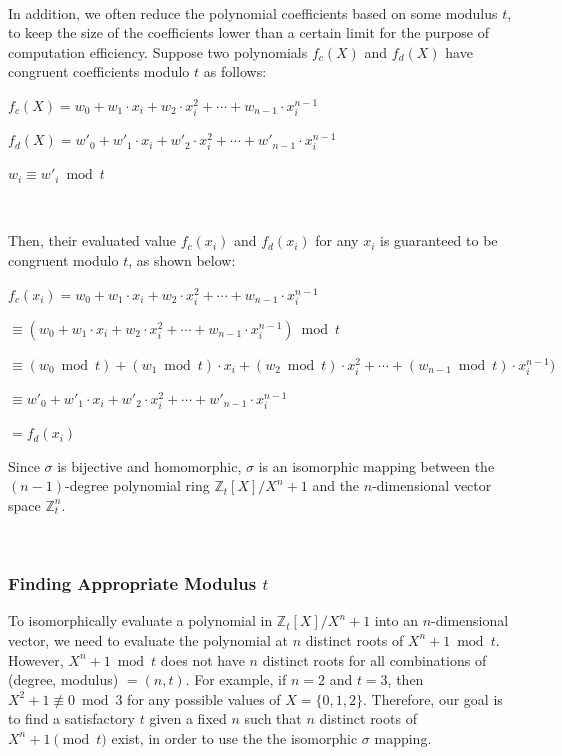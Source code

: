 $ $

 In addition, we often reduce the polynomial coefficients based on some modulus $t$, to keep the size of the coefficients lower than a certain limit for the purpose of computation efficiency. Suppose two polynomials $f_c(X)$ and $f_d(X)$ have congruent coefficients modulo $t$ as follows:

$f_c(X) = w_0 + w_1\cdot x_i + w_2\cdot x_i^2 + \cdots + w_{n-1}\cdot x_i^{n-1}$

$f_d(X) = w'_0 + w'_1\cdot x_i + w'_2\cdot x_i^2 + \cdots + w'_{n-1}\cdot x_i^{n-1} $

$w_i \equiv w'_i \bmod t$

$ $

Then, their evaluated value $f_c(x_i)$ and $f_d(x_i)$ for any $x_i$ is guaranteed to be congruent modulo $t$, as shown below:

$f_c(x_i) = w_0 + w_1\cdot x_i + w_2\cdot x_i^2 + \cdots + w_{n-1}\cdot x_i^{n-1}$

$\equiv (w_0 + w_1\cdot x_i + w_2\cdot x_i^2 + \cdots + w_{n-1}\cdot x_i^{n-1}) \bmod t $

$\equiv (w_0  \bmod t) + (w_1  \bmod t)\cdot x_i + (w_2  \bmod t)\cdot x_i^2 + \cdots + (w_{n-1} \bmod t)\cdot x_i^{n-1}) $

$\equiv w'_0 + w'_1\cdot x_i + w'_2\cdot x_i^2 + \cdots + w'_{n-1}\cdot x_i^{n-1} $

$= f_d(x_i)$

 Since $\sigma$ is bijective and homomorphic, $\sigma$ is an isomorphic mapping between the $(n-1)$-degree polynomial ring $\mathbb{Z}_t[X]/X^n + 1$ and the $n$-dimensional vector space $\mathbb{Z}_t^n$. 


$ $


\subsubsection{Finding Appropriate Modulus $t$} 
\label{subsubsec:poly-vector-transformation-modulus}

To isomorphically evaluate a polynomial in $\mathbb{Z}_t[X]/X^n + 1$ into an $n$-dimensional vector, we need to evaluate the polynomial at $n$ distinct roots of $X^n + 1 \bmod t$. However, $X^n + 1 \bmod t$ does not have $n$ distinct roots for all combinations of (degree, modulus) $ = (n, t)$. For example, if $n = 2$ and $t = 3$, then $X^2+ 1 \not\equiv 0 \bmod 3$ for any possible values of $X = \{0, 1, 2\}$. Therefore, our goal is to find a satisfactory $t$ given a fixed $n$ such that $n$ distinct roots of $X^n + 1 \pmod t$ exist, in order to use the the isomorphic $\sigma$ mapping. 

